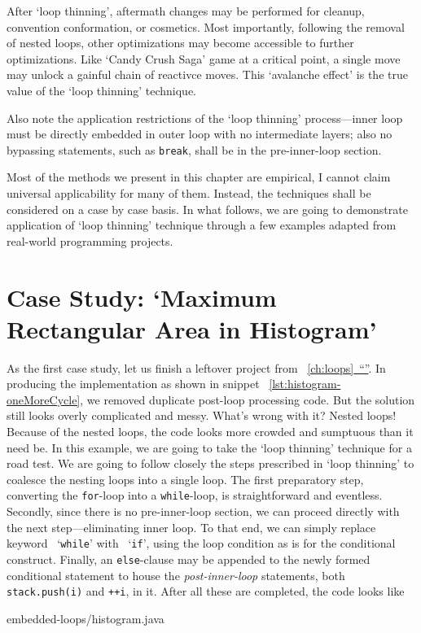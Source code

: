 \documentclass[oneside,11pt]{book}
\theoremstyle{definition}
\theoremstyle{remark}
\newcommand{\code}[1]{\mbox{\lstinline{#1}}}
\newcommand*{\fullref}[1]{\hyperref[{#1}]{\mbox{\autoref*{#1}~}``\nameref*{#1}''}}
\begin{document}
After `loop thinning',
aftermath changes may be performed for cleanup, convention conformation, or cosmetics.
Most importantly, following the removal of nested loops, other optimizations may become
accessible to further optimizations.
Like `Candy Crush Saga' game at a critical point, a single move may unlock a
gainful chain of reactivce moves.
This `avalanche effect' is the true value of the `loop thinning' technique.


Also note the application restrictions of the `loop thinning' process---inner loop must be directly
embedded in
outer loop with no intermediate layers;
also no bypassing statements, such as \code{break}, shall be in the pre-inner-loop section.


Most of the methods we present in this chapter are empirical, I cannot claim
universal applicability for many of them.
Instead, the techniques shall be considered on a case by case basis.
In what follows, we are going to demonstrate application of `loop thinning' technique through
a few examples adapted from real-world programming projects.


\section{Case Study: `Maximum Rectangular Area in Histogram'}
\label{sec:nested-loop-histogram}

As the first case study, let us finish a leftover project from ~\fullref{ch:loops}.
In producing the implementation as shown in snippet ~\autoref{lst:histogram-oneMoreCycle},
we removed duplicate post-loop processing code.
But the solution still looks overly complicated and messy.
What's wrong with it?
Nested loops!
Because of the nested loops, the code looks more crowded and sumptuous than it need be.
In this example, we are going to take the `loop thinning' technique for a road test.
We are going to follow closely the steps prescribed in `loop thinning' to coalesce the
nesting loops into a single loop.
The first preparatory step, converting the \code{for}-loop into a \code{while}-loop, is
straightforward and eventless.
Secondly, since there is no pre-inner-loop section, we can proceed directly with the next
step---eliminating inner loop.
To that end, we can simply replace keyword ~`\code{while}' with ~`\code{if}', using the loop
condition as is for the conditional construct.
Finally, an \code{else}-clause may be appended to the newly formed conditional statement to
house the \emph{post-inner-loop} statements, both \code{stack.push(i)} and \code{++i}, in it.
After all these are completed, the code looks like

{embedded-loops/histogram.java}
\end{document}
